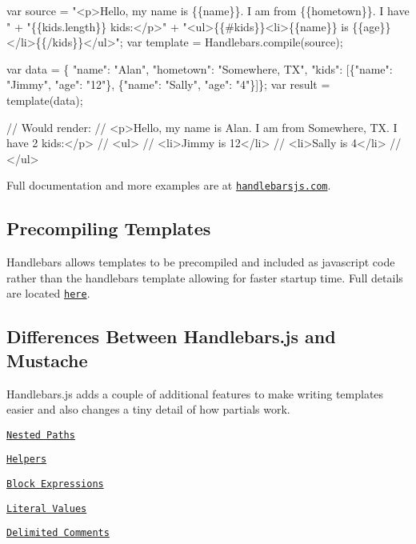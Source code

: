 \begin{DoxyCode}
var source = \textcolor{stringliteral}{"<p>Hello, my name is \{\{name\}\}. I am from \{\{hometown\}\}. I have "} +
             \textcolor{stringliteral}{"\{\{kids.length\}\} kids:</p>"} +
             \textcolor{stringliteral}{"<ul>\{\{#kids\}\}<li>\{\{name\}\} is \{\{age\}\}</li>\{\{/kids\}\}</ul>"};
var \textcolor{keyword}{template} = Handlebars.compile(source);

var data = \{ \textcolor{stringliteral}{"name"}: \textcolor{stringliteral}{"Alan"}, \textcolor{stringliteral}{"hometown"}: \textcolor{stringliteral}{"Somewhere, TX"},
             \textcolor{stringliteral}{"kids"}: [\{\textcolor{stringliteral}{"name"}: \textcolor{stringliteral}{"Jimmy"}, \textcolor{stringliteral}{"age"}: \textcolor{stringliteral}{"12"}\}, \{\textcolor{stringliteral}{"name"}: \textcolor{stringliteral}{"Sally"}, \textcolor{stringliteral}{"age"}: \textcolor{stringliteral}{"4"}\}]\};
var result = \textcolor{keyword}{template}(data);

\textcolor{comment}{// Would render:}
\textcolor{comment}{// <p>Hello, my name is Alan. I am from Somewhere, TX. I have 2 kids:</p>}
\textcolor{comment}{// <ul>}
\textcolor{comment}{//   <li>Jimmy is 12</li>}
\textcolor{comment}{//   <li>Sally is 4</li>}
\textcolor{comment}{// </ul>}
\end{DoxyCode}


Full documentation and more examples are at \href{http://handlebarsjs.com/}{\tt handlebarsjs.\+com}.

\subsection*{Precompiling Templates }

Handlebars allows templates to be precompiled and included as javascript code rather than the handlebars template allowing for faster startup time. Full details are located \href{http://handlebarsjs.com/precompilation.html}{\tt here}.

\subsection*{Differences Between Handlebars.\+js and Mustache }

Handlebars.\+js adds a couple of additional features to make writing templates easier and also changes a tiny detail of how partials work.


\begin{DoxyItemize}
\item \href{http://handlebarsjs.com/#paths}{\tt Nested Paths}
\item \href{http://handlebarsjs.com/#helpers}{\tt Helpers}
\item \href{http://handlebarsjs.com/#block-expressions}{\tt Block Expressions}
\item \href{http://handlebarsjs.com/#literals}{\tt Literal Values}
\item \href{http://handlebarsjs.com/#comments}{\tt Delimited Comments}
\end{DoxyItemize}


